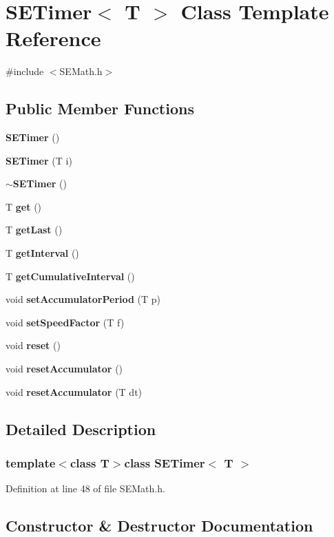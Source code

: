 \section{S\+E\+Timer$<$ T $>$ Class Template Reference}
\label{class_s_e_timer}


{\ttfamily \#include $<$S\+E\+Math.\+h$>$}

\subsection*{Public Member Functions}
\begin{DoxyCompactItemize}
\item 
{\bf S\+E\+Timer} ()
\item 
{\bf S\+E\+Timer} (T i)
\item 
{\bf $\sim$\+S\+E\+Timer} ()
\item 
T {\bf get} ()
\item 
T {\bf get\+Last} ()
\item 
T {\bf get\+Interval} ()
\item 
T {\bf get\+Cumulative\+Interval} ()
\item 
void {\bf set\+Accumulator\+Period} (T p)
\item 
void {\bf set\+Speed\+Factor} (T f)
\item 
void {\bf reset} ()
\item 
void {\bf reset\+Accumulator} ()
\item 
void {\bf reset\+Accumulator} (T dt)
\end{DoxyCompactItemize}


\subsection{Detailed Description}
\subsubsection*{template$<$class T$>$class S\+E\+Timer$<$ T $>$}



Definition at line 48 of file S\+E\+Math.\+h.



\subsection{Constructor \& Destructor Documentation}
